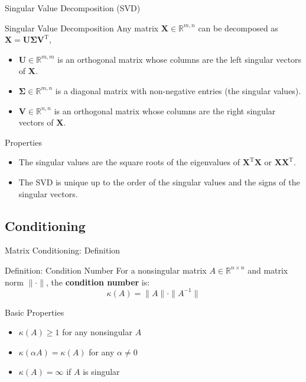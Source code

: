 \documentclass[aspectratio=1610]{beamer}
\begin{document}
\begin{frame}{Singular Value Decomposition (SVD)}

  \begin{block}{Singular Value Decomposition}
    Any matrix $\mathbf{X}\in\mathbb{R}^{m,n}$ can be decomposed as $\mathbf{X} = \mathbf{U}\boldsymbol{\Sigma}\mathbf{V}^\mathrm{T},$
    \begin{itemize}
      \item $\mathbf{U}\in\mathbb{R}^{m,m}$ is an orthogonal matrix whose columns are the left singular vectors of $\mathbf{X}$.
      \item $\boldsymbol{\Sigma}\in\mathbb{R}^{m,n}$ is a diagonal matrix with non-negative entries (the singular values).
      \item $\mathbf{V}\in\mathbb{R}^{n,n}$ is an orthogonal matrix whose columns are the right singular vectors of $\mathbf{X}$.
    \end{itemize}
  \end{block}

  \begin{block}{Properties}
    \footnotesize
    \begin{itemize}
      \item The singular values are the square roots of the eigenvalues of $\mathbf{X}^\mathrm{T}\mathbf{X}$ or $\mathbf{X}\mathbf{X}^\mathrm{T}$.
      \item The SVD is unique up to the order of the singular values and the signs of the singular vectors.
    \end{itemize}
  \end{block}
  
\end{frame}

\subsection{Conditioning}


\begin{frame}{Matrix Conditioning: Definition}

\begin{block}{Definition: Condition Number}
For a nonsingular matrix $A \in \mathbb{R}^{n \times n}$ and matrix norm $\|\cdot\|$, the \textbf{condition number} is:
$$\kappa(A) = \|A\| \cdot \|A^{-1}\|$$
\end{block}


\begin{block}{Basic Properties}
\begin{itemize}
\item $\kappa(A) \geq 1$ for any nonsingular $A$
\item $\kappa(\alpha A) = \kappa(A)$ for any $\alpha \neq 0$
\item $\kappa(A) = \infty$ if $A$ is singular
\end{itemize}
\end{block}

\end{frame}
\end{document}
